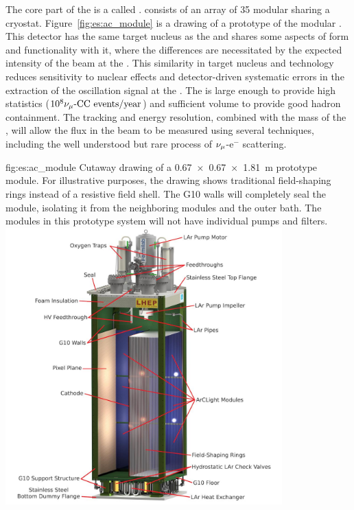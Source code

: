 The core part of the   is a  called .  
 consists of an array of 35 modular  sharing a cryostat.  Figure~\ref{fig:es:ac_module} is a  drawing of a prototype of the modular .  
This detector has the same target nucleus as the  and shares some aspects of form and functionality with it, where the differences are necessitated by the expected intensity of the beam at the .  This similarity in target nucleus and technology reduces sensitivity to nuclear effects and detector-driven systematic errors in the extraction of the oscillation signal at the  .  The  is large enough to provide high statistics %
($\num{e8}{\numu \text{-CC events/year}}$) and sufficient volume to provide good hadron containment.  The tracking and energy resolution, combined with the mass of the , will allow the flux in the beam to be measured using several techniques, including the well understood but rare process of $\nu_\mu$-e$^{-}$ scattering.

\begin{dunefigure}{fig:es:ac_module}
{Cutaway drawing of a \SI{0.67 x 0.67 x 1.81}{\metre}  prototype module. For illustrative purposes, the drawing shows traditional field-shaping rings instead of a resistive field shell. The G10 walls will completely seal the module, isolating it from the neighboring modules and the outer  bath. The modules in this prototype system will not have individual pumps and filters.}
\includegraphics[width=0.8\textwidth]{graphics/Normal-Module-4K_labelled.jpeg}
\end{dunefigure}

